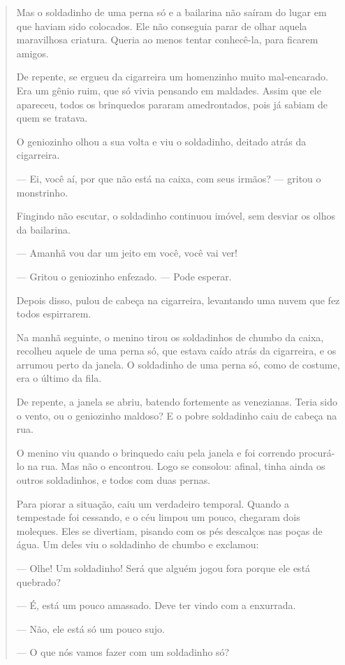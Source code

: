 \begin{escolha}
\begin{escolha}
{\begin{escolha}
\begin{quote}
Mas o soldadinho de uma perna só e a bailarina não saíram do lugar em
que haviam sido colocados. Ele não conseguia parar de olhar aquela
maravilhosa criatura. Queria ao menos tentar conhecê-la, para ficarem
amigos.

De repente, se ergueu da cigarreira um homenzinho muito mal-encarado.
Era um gênio ruim, que só vivia pensando em maldades. Assim que ele
apareceu, todos os brinquedos pararam amedrontados, pois já sabiam de
quem se tratava.

O geniozinho olhou a sua volta e viu o soldadinho, deitado atrás da
cigarreira.

--- Ei, você aí, por que não está na caixa, com seus irmãos? --- gritou
o monstrinho.

Fingindo não escutar, o soldadinho continuou imóvel, sem desviar os
olhos da bailarina.

--- Amanhã vou dar um jeito em você, você vai ver!

--- Gritou o geniozinho enfezado. --- Pode esperar.

Depois disso, pulou de cabeça na cigarreira, levantando uma nuvem que
fez todos espirrarem.

Na manhã seguinte, o menino tirou os soldadinhos de chumbo da caixa,
recolheu aquele de uma perna só, que estava caído atrás da cigarreira, e
os arrumou perto da janela. O soldadinho de uma perna só, como de
costume, era o último da fila.

De repente, a janela se abriu, batendo fortemente as venezianas. Teria
sido o vento, ou o geniozinho maldoso? E o pobre soldadinho caiu de
cabeça na rua.

O menino viu quando o brinquedo caiu pela janela e foi correndo
procurá-lo na rua. Mas não o encontrou. Logo se consolou: afinal, tinha
ainda os outros soldadinhos, e todos com duas pernas.

Para piorar a situação, caiu um verdadeiro temporal. Quando a tempestade
foi cessando, e o céu limpou um pouco, chegaram dois moleques. Eles se
divertiam, pisando com os pés descalços nas poças de água. Um deles viu
o soldadinho de chumbo e exclamou:

--- Olhe! Um soldadinho! Será que alguém jogou fora porque ele está
quebrado?

--- É, está um pouco amassado. Deve ter vindo com a enxurrada.

--- Não, ele está só um pouco sujo.

--- O que nós vamos fazer com um soldadinho só?


\end{quote}
\end{escolha}}
\end{escolha}
\end{escolha}
